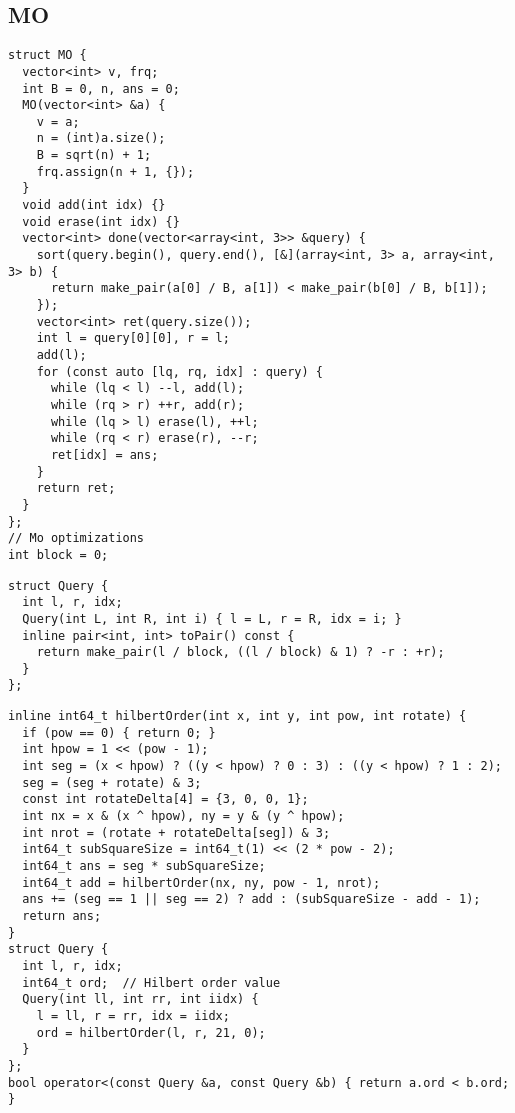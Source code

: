 \documentclass[twoside]{article}
\begin{document}
\begin{multicols*}{2}
{
\subsection*{MO}
}
\begin{verbatim}
struct MO {
  vector<int> v, frq;
  int B = 0, n, ans = 0;
  MO(vector<int> &a) {
    v = a;
    n = (int)a.size();
    B = sqrt(n) + 1;
    frq.assign(n + 1, {});
  }
  void add(int idx) {}
  void erase(int idx) {}
  vector<int> done(vector<array<int, 3>> &query) {
    sort(query.begin(), query.end(), [&](array<int, 3> a, array<int, 3> b) {
      return make_pair(a[0] / B, a[1]) < make_pair(b[0] / B, b[1]);
    });
    vector<int> ret(query.size());
    int l = query[0][0], r = l;
    add(l);
    for (const auto [lq, rq, idx] : query) {
      while (lq < l) --l, add(l);
      while (rq > r) ++r, add(r);
      while (lq > l) erase(l), ++l;
      while (rq < r) erase(r), --r;
      ret[idx] = ans;
    }
    return ret;
  }
};
// Mo optimizations
int block = 0;
\end{verbatim}
\vspace{-12pt}
\begin{verbatim}
struct Query {
  int l, r, idx;
  Query(int L, int R, int i) { l = L, r = R, idx = i; }
  inline pair<int, int> toPair() const {
    return make_pair(l / block, ((l / block) & 1) ? -r : +r);
  }
};
\end{verbatim}
\vspace{-12pt}
\begin{verbatim}
inline int64_t hilbertOrder(int x, int y, int pow, int rotate) {
  if (pow == 0) { return 0; }
  int hpow = 1 << (pow - 1);
  int seg = (x < hpow) ? ((y < hpow) ? 0 : 3) : ((y < hpow) ? 1 : 2);
  seg = (seg + rotate) & 3;
  const int rotateDelta[4] = {3, 0, 0, 1};
  int nx = x & (x ^ hpow), ny = y & (y ^ hpow);
  int nrot = (rotate + rotateDelta[seg]) & 3;
  int64_t subSquareSize = int64_t(1) << (2 * pow - 2);
  int64_t ans = seg * subSquareSize;
  int64_t add = hilbertOrder(nx, ny, pow - 1, nrot);
  ans += (seg == 1 || seg == 2) ? add : (subSquareSize - add - 1);
  return ans;
}
struct Query {
  int l, r, idx;
  int64_t ord;  // Hilbert order value
  Query(int ll, int rr, int iidx) {
    l = ll, r = rr, idx = iidx;
    ord = hilbertOrder(l, r, 21, 0);
  }
};
bool operator<(const Query &a, const Query &b) { return a.ord < b.ord; }
\end{verbatim}


\end{multicols*}
\end{document}

